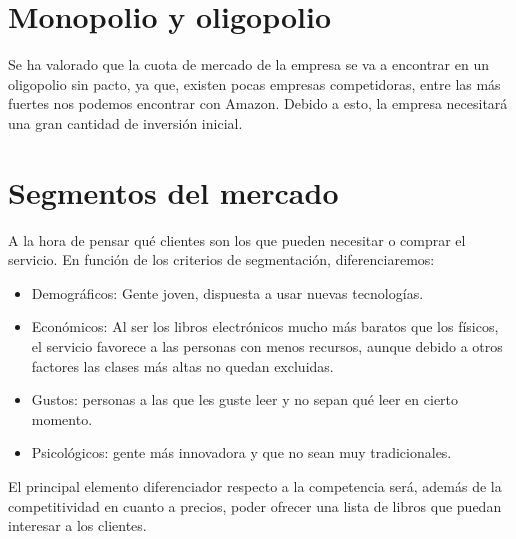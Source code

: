 \documentclass[openany,overnay,a4paper, twoside, 12pt]{book}
\begin{document}
\section{Monopolio y oligopolio}
Se ha valorado que la cuota de mercado de la empresa se va a encontrar en un oligopolio sin pacto, ya que, existen pocas empresas competidoras, entre las más fuertes nos podemos encontrar con Amazon. Debido a esto, la empresa necesitará una gran cantidad de inversión inicial.

\section{Segmentos del mercado}
A la hora de pensar qué clientes son los que pueden necesitar o comprar el servicio. En función de los criterios de segmentación, diferenciaremos:
\begin{itemize}
\item Demográficos: Gente joven, dispuesta a usar nuevas tecnologías.
\item Económicos: Al ser los libros electrónicos mucho más baratos que los físicos, el servicio favorece a las personas con menos recursos, aunque debido a otros factores las clases más altas no quedan excluidas. 
\item Gustos: personas a las que les guste leer y no sepan qué leer en cierto momento.
\item Psicológicos: gente más innovadora y que no sean muy tradicionales.
\end{itemize}
El principal elemento diferenciador respecto a la competencia será, además de la competitividad en cuanto a precios, poder ofrecer una lista de libros que puedan interesar a los clientes.
\end{document}
